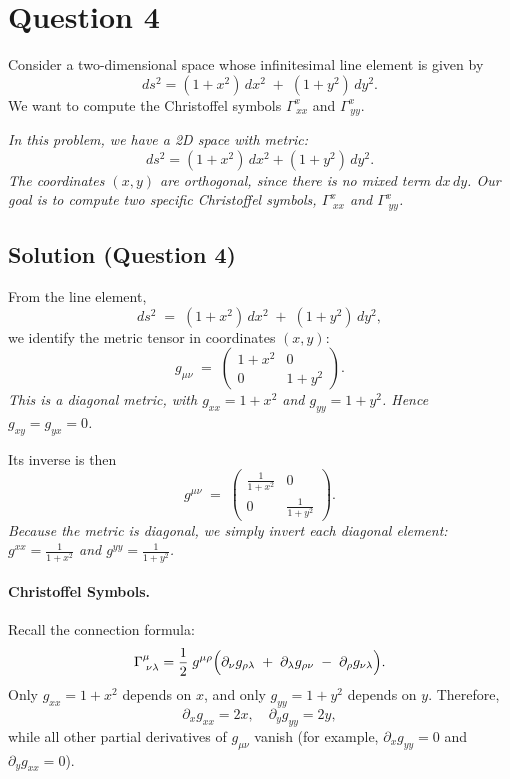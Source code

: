 \section*{Question 4}

\noindent
Consider a two-dimensional space whose infinitesimal line element is given by
\[
ds^2 = (1 + x^2)\,dx^2 \;+\; (1 + y^2)\,dy^2.
\]
We want to compute the Christoffel symbols \(\Gamma^{x}_{\,xx}\) and \(\Gamma^{x}_{\,yy}\).

\emph{In this problem, we have a 2D space with metric:
\[
ds^2 = (1 + x^2)\,dx^2 + (1 + y^2)\,dy^2.
\]
The coordinates \((x, y)\) are orthogonal, since there is no mixed term \(dx\,dy\). Our goal is to compute two specific Christoffel symbols, \(\Gamma^x_{\;xx}\) and \(\Gamma^x_{\;yy}\).}

\subsection*{Solution (Question 4)}

\noindent
From the line element,
\[
ds^2 \;=\; (1 + x^2)\,dx^2 \;+\; (1 + y^2)\,dy^2,
\]
we identify the metric tensor in coordinates \((x,y)\):
\[
g_{\mu\nu} \;=\;
\begin{pmatrix}
1 + x^2 & 0 \\
0 & 1 + y^2
\end{pmatrix}.
\]
\emph{This is a diagonal metric, with \(g_{xx} = 1 + x^2\) and \(g_{yy} = 1 + y^2\). Hence \(g_{xy} = g_{yx} = 0\).}

Its inverse is then
\[
g^{\mu\nu} \;=\;
\begin{pmatrix}
\frac{1}{1 + x^2} & 0 \\
0 & \frac{1}{1 + y^2}
\end{pmatrix}.
\]
\emph{Because the metric is diagonal, we simply invert each diagonal element: \(g^{xx} = \tfrac{1}{1+x^2}\) and \(g^{yy} = \tfrac{1}{1+y^2}\).}

\medskip

\paragraph{Christoffel Symbols.}
Recall the connection formula:
\[
\Gamma^{\mu}_{\;\nu\lambda}
=
\frac{1}{2}\;g^{\mu\rho}
\Bigl(
\partial_\nu g_{\rho\lambda}
\;+\;
\partial_\lambda g_{\rho\nu}
\;-\;
\partial_\rho g_{\nu\lambda}
\Bigr).
\]
Only \(g_{xx} = 1 + x^2\) depends on \(x\), and only \(g_{yy} = 1 + y^2\) depends on \(y\). Therefore,
\[
\partial_x g_{xx} = 2x,
\quad
\partial_y g_{yy} = 2y,
\]
while all other partial derivatives of \(g_{\mu\nu}\) vanish (for example, \(\partial_x g_{yy} = 0\) and \(\partial_y g_{xx} = 0\)).

